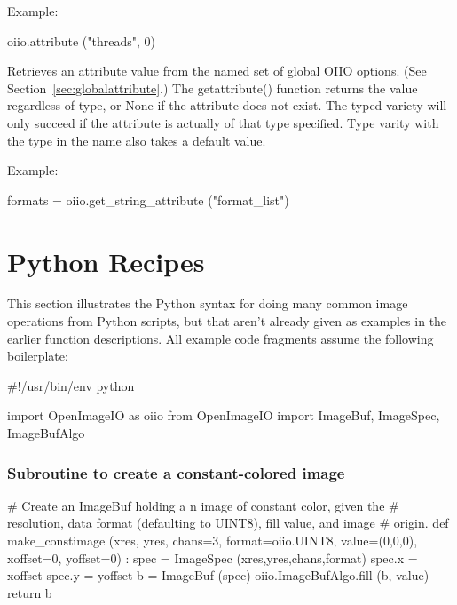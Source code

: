 \noindent Example:
\begin{code}
    oiio.attribute ("threads", 0)
\end{code}
\apiend

Retrieves an attribute value from the named set of global OIIO options. (See
Section~\ref{sec:globalattribute}.) The {\cf getattribute()} function
returns the value regardless of type, or {\cf None} if the attribute does
not exist.  The typed variety will only succeed if the attribute is actually
of that type specified. Type varity with the type in the name also takes a
default value.

\noindent Example:
\begin{code}
    formats = oiio.get_string_attribute ("format_list")
\end{code}
\apiend



\section{Python Recipes}
\label{sec:pythonrecipes}

This section illustrates the Python syntax for doing many common image
operations from Python scripts, but that aren't already given as examples
in the earlier function descriptions.  All example code fragments assume the
following boilerplate:

\begin{code}
    #!/usr/bin/env python 
    
    import OpenImageIO as oiio
    from OpenImageIO import ImageBuf, ImageSpec, ImageBufAlgo
\end{code}


\subsubsection*{Subroutine to create a constant-colored image}
\begin{code}
    # Create an ImageBuf holding a n image of constant color, given the
    # resolution, data format (defaulting to UINT8), fill value, and image
    # origin.
    def make_constimage (xres, yres, chans=3, format=oiio.UINT8, value=(0,0,0),
                         xoffset=0, yoffset=0) :
        spec = ImageSpec (xres,yres,chans,format)
        spec.x = xoffset
        spec.y = yoffset
        b = ImageBuf (spec)
        oiio.ImageBufAlgo.fill (b, value)
        return b
\end{code}

